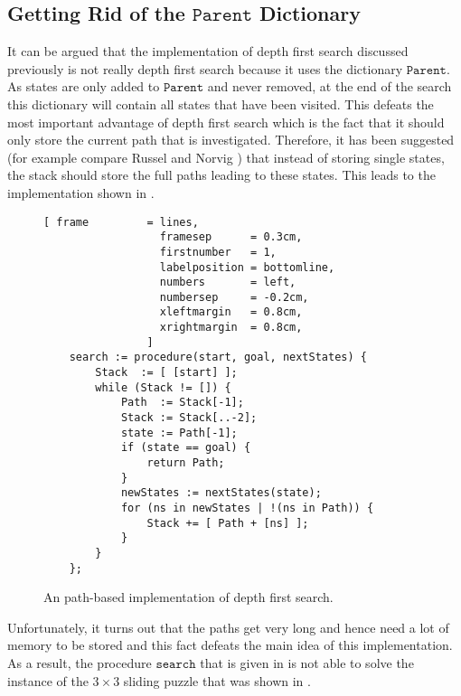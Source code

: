 \subsection{Getting Rid of the $\mathtt{Parent}$ Dictionary}
It can be argued that the implementation of depth first search discussed previously is not really
depth first search because it uses the dictionary $\mathtt{Parent}$.  As states are only added to
$\mathtt{Parent}$ and never removed, at the end of the search this dictionary will contain all
states that have been visited.  This defeats the most important advantage of depth first search
which is the fact that it should only store the current path that is investigated.  Therefore,
it has been suggested (for example compare Russel and Norvig \cite{russell:2009}) that instead of
storing single states, the stack should store the full paths leading to these states.  This leads to
the implementation shown in . 

\begin{figure}[!ht]
\centering
\begin{Verbatim}[ frame         = lines, 
                  framesep      = 0.3cm, 
                  firstnumber   = 1,
                  labelposition = bottomline,
                  numbers       = left,
                  numbersep     = -0.2cm,
                  xleftmargin   = 0.8cm,
                  xrightmargin  = 0.8cm,
                ]
    search := procedure(start, goal, nextStates) {
        Stack  := [ [start] ];
        while (Stack != []) {
            Path  := Stack[-1];
            Stack := Stack[..-2];
            state := Path[-1];
            if (state == goal) {
                return Path;
            }
            newStates := nextStates(state);
            for (ns in newStates | !(ns in Path)) { 
                Stack += [ Path + [ns] ];
            }
        }
    };
\end{Verbatim}
\vspace*{-0.3cm}
\caption{An path-based implementation of depth first search.}
\label{fig:depth-first-search-path.stlx}
\end{figure}

Unfortunately, it  turns out that the paths get very long and hence need a lot of memory to be
stored and this fact defeats the main idea of this implementation.  As a result, the procedure
$\mathtt{search}$ that is given in  is not able to solve the
instance of the  $3 \times 3$ sliding puzzle that was shown in .


